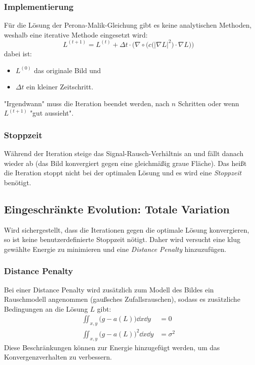 			\subsubsection{Implementierung}
				Für die Lösung der Perona-Malik-Gleichung gibt es keine analytischen Methoden, weshalb eine iterative Methode eingesetzt wird:
				\begin{equation*}
					L^{(t + 1)} = L^{(t)} + \Delta t \cdot \bigg( \nabla \circ \Big( c\big(\lvert \nabla L \rvert^2\big) \cdot \nabla L \Big) \bigg)
				\end{equation*}
				dabei ist:
				\begin{itemize}
					\item \( L^{(0)} \) das originale Bild und
					\item \( \Delta t \) ein kleiner Zeitschritt.
				\end{itemize}
				"Irgendwann" muss die Iteration beendet werden, \zB nach \(n\) Schritten oder wenn \( L^{(t + 1)} \) "gut aussieht".

			\subsubsection{Stoppzeit}
				Während der Iteration steige das Signal-Rausch-Verhältnis \iA an und fällt danach wieder ab (das Bild konvergiert gegen eine gleichmäßig graue Fläche). Das heißt die Iteration stoppt nicht bei der optimalen Lösung und es wird eine \emph{Stoppzeit} benötigt.

		\subsection{Eingeschränkte Evolution: Totale Variation}
			Wird sichergestellt, dass die Iterationen gegen die optimale Lösung konvergieren, so ist keine benutzerdefinierte Stoppzeit nötigt. Daher wird versucht eine klug gewählte Energie zu minimieren und eine \emph{Distance Penalty} hinzuzufügen.

			\subsubsection{Distance Penalty}
				Bei einer Distance Penalty wird zusätzlich zum Modell des Bildes ein Rauschmodell angenommen (\zB gaußsches Zufallsrauschen), sodass es zusätzliche Bedingungen an die Lösung \(L\) gibt:
				\begin{align*}
					\iint_{x, y} \! \big( g - a(L) \big) \dd{x} \dd{y} &= 0 \\
					\iint_{x, y} \! \big( g - a(L) \big)^2 \dd{x} \dd{y} &= \sigma^2
				\end{align*}
				Diese Beschränkungen können zur Energie hinzugefügt werden, um das Konvergenzverhalten zu verbessern.

